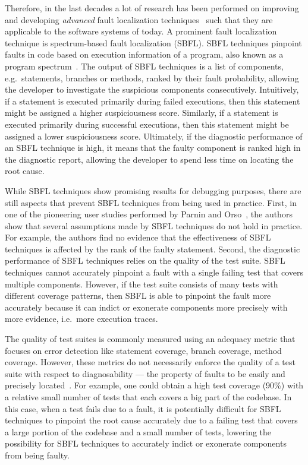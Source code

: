 \documentclass[twoside,a4paper,11pt]{memoir}
\begin{document}
Therefore, in the last decades a lot of research has been performed on improving and developing \emph{advanced} fault localization techniques~\cite{wong2016survey} such that they are applicable to the software systems of today.
A prominent fault localization technique is spectrum-based fault localization (SBFL).
SBFL techniques pinpoint faults in code based on execution information of a program, also known as a program spectrum~\cite{reps1997use}.
The output of SBFL techniques is a list of components, e.g.\ statements, branches or methods, ranked by their fault probability, allowing the developer to investigate the suspicious components consecutively.
Intuitively, if a statement is executed primarily during failed executions, then this statement might be assigned a higher suspiciousness score.
Similarly, if a statement is executed primarily during successful executions, then this statement might be assigned a lower suspiciousness score.
Ultimately, if the diagnostic performance of an SBFL technique is high, it means that the faulty component is ranked high in the diagnostic report, allowing the developer to spend less time on locating the root cause.

While SBFL techniques show promising results for debugging purposes, there are still aspects that prevent SBFL techniques from being used in practice.
First, in one of the pioneering user studies performed by Parnin and Orso~\cite{Parnin:2011:ADT:2001420.2001445}, the authors show that several assumptions made by SBFL techniques do not hold in practice.
For example, the authors find no evidence that the effectiveness of SBFL techniques is affected by the rank of the faulty statement.
Second, the diagnostic performance of SBFL techniques relies on the quality of the test suite.
SBFL techniques cannot accurately pinpoint a fault with a single failing test that covers multiple components.
However, if the test suite consists of many tests with different coverage patterns, then SBFL is able to pinpoint the fault more accurately because it can indict or exonerate components more precisely with more evidence, i.e.\ more execution traces.

The quality of test suites is commonly measured using an adequacy metric that focuses on error detection like statement coverage, branch coverage, method coverage.
However, these metrics do not necessarily enforce the quality of a test suite with respect to diagnosability --- the property of faults to be easily and precisely located~\cite{730889}.
For example, one could obtain a high test coverage (90\%) with a relative small number of tests that each covers a big part of the codebase.
In this case, when a test fails due to a fault, it is potentially difficult for SBFL techniques to pinpoint the root cause accurately due to a failing test that covers a large portion of the codebase and a small number of tests, lowering the possibility for SBFL techniques to accurately indict or exonerate components from being faulty.
\end{document}
